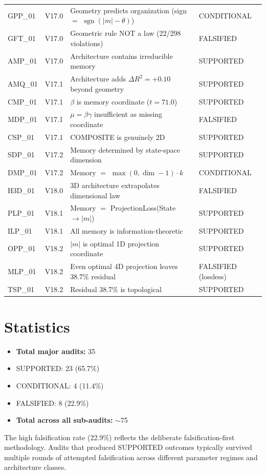 \documentclass[11pt,a4paper,oneside]{report}
\newcommand{\supported}{\textcolor{supported}{SUPPORTED}}
\newcommand{\conditional}{\textcolor{conditional}{CONDITIONAL}}
\newcommand{\falsified}{\textcolor{falsified}{FALSIFIED}}
\DeclareMathOperator{\sgn}{sgn}
\begin{document}
\begin{appendices}
\begin{table}[h]
\begin{tabular}{llp{5.5cm}l}
GPP\_01 & V17.0 & Geometry predicts organization (sign $=$ $\sgn(|m|-\theta)$) & \conditional{}\\
GFT\_01 & V17.0 & Geometric rule NOT a law (22/298 violations) & \falsified{}\\
AMP\_01 & V17.0 & Architecture contains irreducible memory & \supported{}\\
AMQ\_01 & V17.1 & Architecture adds $\Delta R^2 = +0.10$ beyond geometry & \supported{}\\
CMP\_01 & V17.1 & $\beta$ is memory coordinate ($t=71.0$) & \supported{}\\
MDP\_01 & V17.1 & $\mu=\beta\gamma$ insufficient as missing coordinate & \falsified{}\\
CSP\_01 & V17.1 & COMPOSITE is genuinely 2D & \supported{}\\
SDP\_01 & V17.2 & Memory determined by state-space dimension & \supported{}\\
DMP\_01 & V17.2 & Memory $=$ $\max(0, \dim-1)\cdot k$ & \conditional{}\\
H3D\_01 & V18.0 & 3D architecture extrapolates dimensional law & \falsified{}\\
PLP\_01 & V18.1 & Memory $=$ ProjectionLoss(State $\rightarrow |m|$) & \supported{}\\
ILP\_01 & V18.1 & All memory is information-theoretic & \supported{}\\
OPP\_01 & V18.2 & $|m|$ is optimal 1D projection coordinate & \supported{}\\
MLP\_01 & V18.2 & Even optimal 4D projection leaves 38.7\% residual & \falsified{} (lossless)\\
TSP\_01 & V18.2 & Residual 38.7\% is topological & \supported{}\\
\bottomrule
\end{tabular}
\end{table}

\section{Statistics}

\begin{itemize}[nosep]
  \item \textbf{Total major audits:} 35
  \item \supported{}: 23 (65.7\%)
  \item \conditional{}: 4 (11.4\%)
  \item \falsified{}: 8 (22.9\%)
  \item \textbf{Total across all sub-audits:} $\sim$75
\end{itemize}

The high falsification rate (22.9\%) reflects the deliberate falsification-first
methodology. Audits that produced \supported{} outcomes typically survived
multiple rounds of attempted falsification across different parameter regimes
and architecture classes.

\end{appendices}


\end{document}
